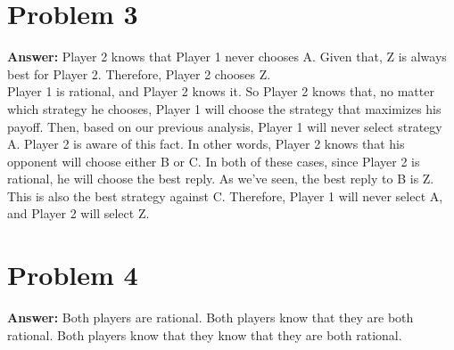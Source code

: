 \documentclass[11pt]{article}
\begin{document}
\section*{Problem 3}
\label{sec:org8d9a2b5}

\textbf{Answer:} Player 2 knows that Player 1 never chooses A. Given that, Z is always
best for Player 2. Therefore, Player 2 chooses Z.\\

Player 1 is rational, and Player 2 knows it. So Player 2 knows that, no matter
which strategy he chooses, Player 1 will choose the strategy that maximizes his
payoff. Then, based on our previous analysis, Player 1 will never select
strategy A. Player 2 is aware of this fact. In other words, Player 2 knows that
his opponent will choose either B or C. In both of these cases, since Player 2
is rational, he will choose the best reply. As we've seen, the best reply to B
is Z. This is also the best strategy against C. Therefore, Player 1 will never
select A, and Player 2 will select Z.
\section*{Problem 4}
\label{sec:org9a38ad3}

\textbf{Answer:} Both players are rational. Both players know that they are both
rational. Both players know that they know that they are both rational.\\
\end{document}
